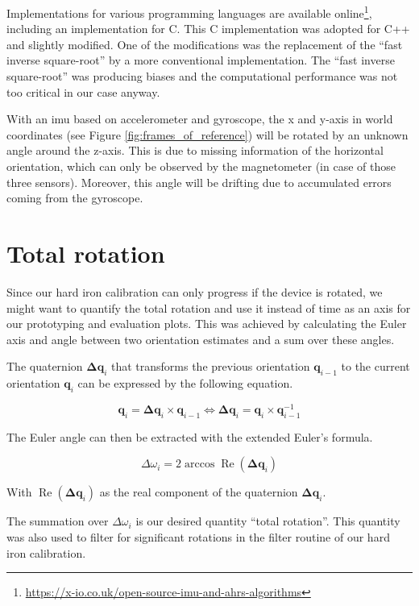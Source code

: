 Implementations for various programming languages are available online\footnote{\url{https://x-io.co.uk/open-source-imu-and-ahrs-algorithms}}, including an implementation for C. This C implementation was adopted for C++ and slightly modified. One of the modifications was the replacement of the ``fast inverse square-root'' by a more conventional implementation. The ``fast inverse square-root'' was producing biases and the computational performance was not too critical in our case anyway.

With an \gls{imu} based on accelerometer and gyroscope, the x and y-axis in world coordinates (see Figure \ref{fig:frames_of_reference}) will be rotated by an unknown angle around the z-axis. This is due to missing information of the horizontal orientation, which can only be observed by the magnetometer (in case of those three sensors). Moreover, this angle will be drifting due to accumulated errors coming from the gyroscope.

\section{Total rotation}

Since our hard iron calibration can only progress if the device is rotated, we might want to quantify the total rotation and use it instead of time as an axis for our prototyping and evaluation plots. This was achieved by calculating the Euler axis and angle between two orientation estimates and a sum over these angles.

The quaternion $\bm{\Delta q}_i$ that transforms the previous orientation $\bm{q}_{i-1}$ to the current orientation $\bm{q}_i$ can be expressed by the following equation.

\begin{equation}
\label{eq:impl_totalrot_q}
    \bm{q}_i = \bm{\Delta q}_i \times \bm{q}_{i-1} \iff \bm{\Delta q}_i = \bm{q}_i \times \bm{q}_{i-1}^{-1}
\end{equation}

The Euler angle can then be extracted with the extended Euler's formula.

\begin{equation}
\label{eq:impl_totalrot}
    \Delta \omega_i = 2 \arccos{\operatorname{Re}(\bm{\Delta q}_i)}
\end{equation}

With $\operatorname{Re}(\bm{\Delta q}_i)$ as the real component of the quaternion $\bm{\Delta q}_i$.

The summation over $\Delta \omega_i$ is our desired quantity ``total rotation''. This quantity was also used to filter for significant rotations in the filter routine of our hard iron calibration.

